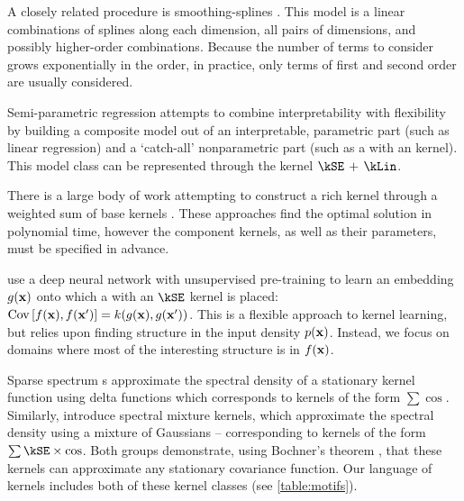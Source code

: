 A closely related procedure is smoothing-splines \ANOVA{} \citep{wahba1990spline, gu2002smoothing}.
This model is a linear combinations of splines along each dimension, all pairs of dimensions, and possibly higher-order combinations.
Because the number of terms to consider grows exponentially in the order, in practice, only terms of first and second order are usually considered.

Semi-parametric regression \citep[e.g.][]{ruppert2003semiparametric} attempts to combine interpretability with flexibility by building a composite model out of an interpretable, parametric part (such as linear regression) and a `catch-all' nonparametric part (such as a \gp{} with an \kSE{} kernel).
This model class can be represented through the kernel ${\kSE \kernplus \kLin}$.


There is a large body of work attempting to construct a rich kernel through a weighted sum of base kernels \citep[e.g.][]{christoudias2009bayesian, Bach_HKL}.
These approaches find the optimal solution in polynomial time, however the component kernels, as well as their parameters, must be specified in advance.


\citet{salakhutdinov2008using} use a deep neural network with unsupervised pre-training to learn an embedding $g({\bf{x}})$ onto which a \gp{} with an $\kSE$ kernel is placed: ${\operatorname{Cov}{[f({\bf{x}}), f({\bf{x}}')]} = k(g({\bf{x}}), g({\bf{x}}'))}$.
This is a flexible approach to kernel learning, but relies upon finding structure in the input density $p({\bf{x}})$.
Instead, we focus on domains where most of the interesting structure is in $f({\bf{x}})$.

Sparse spectrum \gp{}s \citep{lazaro2010sparse} approximate the spectral density of a stationary kernel function using delta functions which corresponds to kernels of the form $\sum \cos$.
Similarly, \citet{WilAda13} introduce spectral mixture kernels, which approximate the spectral density using a mixture of Gaussians -- corresponding to kernels of the form $\sum \kSE \times \cos$.
Both groups demonstrate, using Bochner's theorem \citep{bochner1959lectures}, that these kernels can approximate any stationary covariance function.
Our language of kernels includes both of these kernel classes (see \cref{table:motifs}).

